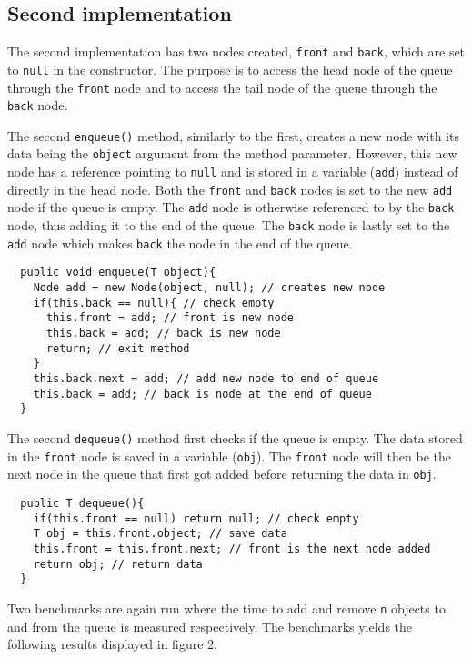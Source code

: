 \documentclass[a4paper,11pt]{article}
\begin{document}
\subsection*{Second implementation}

The second implementation has two nodes created, {\tt front} and 
{\tt back}, which are set to {\tt null} in the constructor. The 
purpose is to access the head node of the queue through the {\tt front} 
node and to access the tail node of the queue through the {\tt back} 
node.

The second {\tt enqueue()} method, similarly to the first, creates a 
new node with its data being the {\tt object} argument from the method 
parameter. However, this new node has a reference pointing to 
{\tt null} and is stored in a variable ({\tt add}) instead of directly 
in the head node. Both the {\tt front} and {\tt back} nodes is set to 
the new {\tt add} node if the queue is empty. The {\tt add} node is 
otherwise referenced to by the {\tt back} node, thus adding it to the
end of the queue. The {\tt back} node is lastly set to the {\tt add} 
node which makes {\tt back} the node in the end of the queue.

\begin{verbatim}
  public void enqueue(T object){
    Node add = new Node(object, null); // creates new node
    if(this.back == null){ // check empty
      this.front = add; // front is new node
      this.back = add; // back is new node
      return; // exit method
    }
    this.back.next = add; // add new node to end of queue
    this.back = add; // back is node at the end of queue
  }
\end{verbatim}

The second {\tt dequeue()} method first checks if the queue is empty. 
The data stored in the {\tt front} node is saved in a variable 
({\tt obj}). The {\tt front} node will then be the next node in the 
queue that first got added before returning the data in {\tt obj}.

\begin{verbatim}
  public T dequeue(){
    if(this.front == null) return null; // check empty
    T obj = this.front.object; // save data
    this.front = this.front.next; // front is the next node added
    return obj; // return data
  }
\end{verbatim}

Two benchmarks are again run where the time to add and remove {\tt n} 
objects to and from the queue is measured respectively. The benchmarks 
yields the following results displayed in figure 2.
\end{document}
